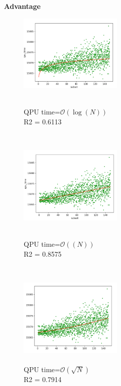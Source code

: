 \documentclass[oneside,a4paper]{article}
\begin{document}
\textbf{Advantage}

\begin{figure}[htp]
\begin{minipage}[b]{5cm}
\includegraphics[width=5cm]{LaTeXTemplate/Images/AdvantagePossibleFitting1.png}
\caption{\\QPU time=$\mathcal{O}(\log(N))$\\
R2 = 0.6113 \\
}
\end{minipage}
\ \hspace{2mm} \hspace{2mm} \
\begin{minipage}[b]{5cm}
\includegraphics[width=5cm]{LaTeXTemplate/Images/AdvantagePossibleFitting2.png}
\caption{\\QPU time=$\mathcal{O}((N))$\\
{\color{ForestGreen} R2 = 0.8575\\}}
\end{minipage}
\ \hspace{2mm} \hspace{2mm} \
\begin{minipage}[b]{5cm}
\centering
\includegraphics[width=5cm]{LaTeXTemplate/Images/AdvantagePossibleFitting3.png}
\caption{\\QPU time=$\mathcal{O}(\sqrt{N})$\\
R2 = 0.7914 \\}
\end{minipage}
\end{figure}
\end{document}
